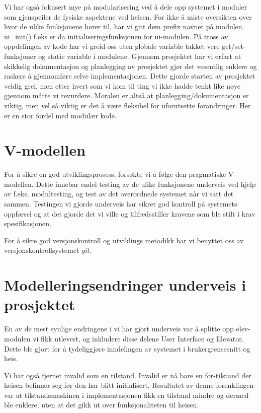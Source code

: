 \documentclass[language=norsk]{ezreport}
\begin{document}
Vi har også fokusert mye på modularisering ved å dele opp systemet i moduler som gjenspeiler de fysiske aspektene ved heisen. For ikke å miste oversikten over hvor de ulike funksjonene hører til, har vi gitt dem prefix navnet på modulen. ui\_init() f.eks er da initialiseringsfunksjonen for ui-modulen. På tross av oppdelingen av kode har vi greid oss uten globale variable takket vere get/set-funksjoner og static variable i modulene. Gjennom prosjektet har vi erfart at skikkelig dokumentasjon og planlegging av prosjektet gjør det vesentlig enklere og raskere å gjennomføre selve implementasjonen. Dette gjorde starten av prosjektet veldig grei, men etter hvert som vi kom til ting vi ikke hadde tenkt like nøye gjennom måtte vi revurdere. Moralen er altså at planlegging/dokumentasjon er viktig, men vel så viktig er det å være fleksibel for uforutsette forandringer. Her er en stor fordel med modulær kode.

\section*{V-modellen}
For å sikre en god utviklingsprosess, forsøkte vi å følge den pragmatiske V-modellen. Dette innebar endel testing av de ulike funksjonene underveis ved hjelp av f.eks. modultesting, og test av det overordnede systemet når vi satt det sammen. Testingen vi gjorde underveis har sikret god kontroll på systemets oppførsel og at det gjorde det vi ville og tilfredsstiller kravene som ble stilt i krav spesifikasjonen.

For å sikre god versjonskontroll og utviklings metodikk har vi benyttet oss av versjonskontrollsystemet \emph{git}.

\section*{Modelleringsendringer underveis i prosjektet}
En av de mest synlige endringene i vi har gjort underveis var å splitte opp elev-modulen vi fikk utlevert, og inkludere disse delene User Interface og Elevator. Dette ble gjort for å tydeliggjøre inndelingen av systemet i brukergrensesnitt og heis.

Vi har også fjernet invalid som en tilstand. Invalid er nå bare en for-tilstand der heisen befinner seg før den har blitt initialisert. Resultatet av denne forenklingen var at tilstandsmaskinen i implementasjonen fikk en tilstand mindre og dermed ble enklere, uten at det gikk ut over funksjonaliteten til heisen.
\end{document}
